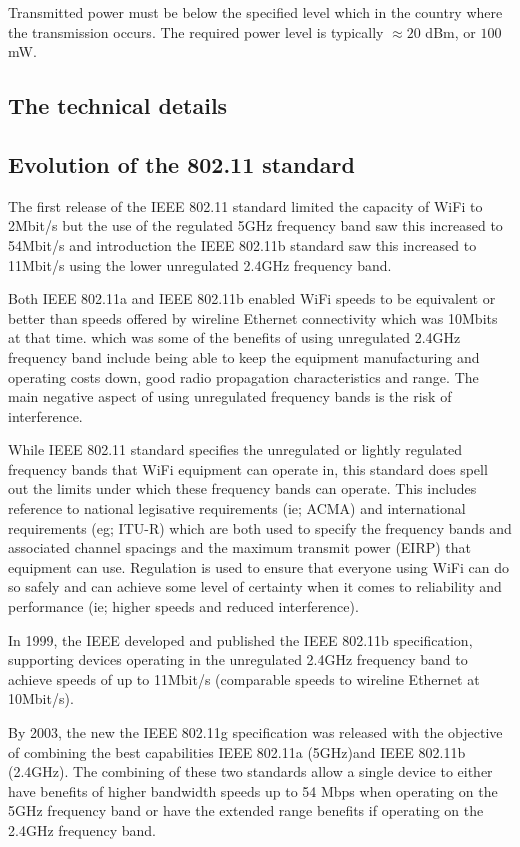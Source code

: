 Transmitted power must be below the specified level
which in the country where the transmission occurs.
The required power level is typically $\approx 20$ dBm, or $100$ mW.

\subsection{The technical details}

\subsection{Evolution of the 802.11 standard}

The first release of the IEEE 802.11 standard
limited the capacity of WiFi to 2Mbit/s but the use of the regulated
5GHz frequency band saw this increased to 54Mbit/s and introduction the
IEEE 802.11b standard saw this increased to 11Mbit/s using the lower
unregulated 2.4GHz frequency band.

Both IEEE 802.11a and IEEE 802.11b enabled WiFi speeds to be equivalent
or better than speeds offered by wireline Ethernet connectivity
which was  10Mbits at that time. which was some of the benefits of
using unregulated 2.4GHz frequency band include being able to keep the
equipment manufacturing and operating costs down, good radio propagation
characteristics and range.  The main negative aspect of using unregulated
frequency bands is the risk of interference.

While IEEE 802.11 standard specifies the unregulated or lightly regulated
frequency bands that WiFi equipment can operate in, this standard does
spell out the limits under which these frequency bands can operate.
This includes reference to national legisative requirements (ie; ACMA)
and international requirements (eg; ITU-R) which are both used to specify
the frequency bands and associated channel spacings and the maximum
transmit power (EIRP) that equipment can use. Regulation is used to
ensure that everyone using WiFi can do so safely and can achieve some
level of certainty when it comes to reliability and performance (ie;
higher speeds and reduced interference).

In 1999, the IEEE developed and published the IEEE 802.11b specification,
supporting devices operating in the unregulated 2.4GHz frequency band to
achieve speeds of up to 11Mbit/s (comparable speeds to wireline Ethernet
at 10Mbit/s).

By 2003, the new the IEEE 802.11g specification was released with the
objective of combining the best capabilities IEEE 802.11a (5GHz)and IEEE
802.11b (2.4GHz). The combining of these two standards allow a single
device to either have benefits of higher bandwidth speeds up to 54 Mbps
when operating on the 5GHz frequency band or have the extended range
benefits if operating on the 2.4GHz frequency band.

